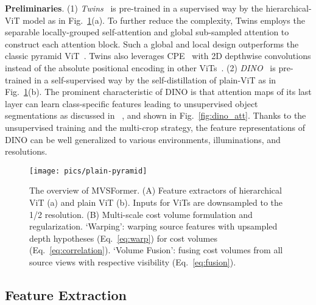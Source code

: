 \documentclass[10pt]{article} \usepackage[preprint]{tmlr}
\begin{document}
\noindent\textbf{Preliminaries}.
(1) \textit{Twins}~\citep{chu2021twins} is pre-trained in a supervised way by the hierarchical-ViT model as in Fig.~\ref{fig:overview}(a).
To further reduce the complexity, Twins employs the separable locally-grouped self-attention and global sub-sampled attention to construct each attention block. Such a global and local design outperforms the classic pyramid ViT~\citep{wang2021pyramid}. 
Twins also leverages CPE~\citep{chu2021conditional} with 2D depthwise convolutions instead of the absolute positional encoding in other ViTs~\citep{dosovitskiy2020image}.
(2) \textit{DINO}~\citep{caron2021emerging} is pre-trained in a self-supervised way by the self-distillation of plain-ViT as in Fig.~\ref{fig:overview}(b).
The prominent characteristic of DINO is that attention maps of its last layer can learn class-specific features leading to unsupervised object segmentations as discussed in ~\citet{caron2021emerging}, and shown in Fig.~\ref{fig:dino_att}. 
Thanks to the unsupervised training and the multi-crop strategy, the feature representations of DINO can be well generalized to various environments, illuminations, and resolutions.

\begin{figure}
\begin{centering}
\texttt{[image: pics/plain-pyramid]} 
\par\end{centering}
\caption{The overview of MVSFormer. (A) Feature extractors of hierarchical ViT (a) and plain ViT (b). Inputs for ViTs are downsampled to the 1/2 resolution. (B) Multi-scale cost volume formulation and regularization.
`Warping': warping source features with upsampled depth hypotheses (Eq.~\ref{eq:warp}) for cost volumes (Eq.~\ref{eq:correlation}). `Volume Fusion': fusing cost volumes from all source views with respective visibility (Eq.~\ref{eq:fusion}).}
\label{fig:overview}
\vspace{-0.1in}
\end{figure}


\subsection{Feature Extraction}
\label{sec:feature_extraction}
\end{document}
